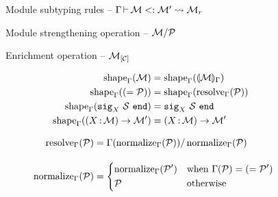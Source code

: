 \documentclass{article}
\theoremstyle{definition}
\begin{document}
\begin{figure}[tbp]
  \vspace{-3mm}
  \caption{Module subtyping rules -- $\submod{\E}{\iM}{\iM'}{\iM_r}$}
  \label{module:subtyping}
\end{figure}

\begin{figure}[tbp]
  
  \caption{Module strengthening operation -- $\Sstrengthen{l}{\iP}{\iM}$}
  \label{module:strengthen}
\end{figure}

\begin{figure}[tbp]
  
  \caption{Enrichment operation -- $\Senrich{\iC}{\iM}$}
  \label{module:enrich}
\end{figure}

\begin{figure}[tbp]
  \vspace{-3mm}
  \caption{Lookup rules -- $\lookup{\E}{\ip} = \iM$}
  \label{module:lookup}

  \begin{subfigure}[t]{0.5\linewidth}
    \begin{align*}
      \Oshape{\E}{\iM} &= \Oshape{\E}{\Oreduce{\E}{\iM}}\\
      \Oshape{\E}{\Salias{\iP}} &= \Oshape{\E}{\resolve{\E}{\iP}}\\
      \Oshape{\E}{\Ssig{\ix}{\iS}} &= \Ssig{\ix}{\iS}\\
      \Oshape{\E}{\Sfunctor{\ix}{\iM}{\iM'}} &= \Sfunctor{\ix}{\iM}{\iM'}
    \end{align*}
  \end{subfigure}
  \begin{subfigure}[t]{0.5\linewidth}
    \begin{align*}
      \resolve{\E}{\iP}
      &= \Sstrengthen{}{\Onormalize{\E}{\iP}}{\lookup{\E}{\Onormalize{\E}{\iP}}}
      \\[1em]
      \Onormalize{\E}{\iP}
      &=
        \begin{dcases}
          \Onormalize{\E}{\iP'} & \text{when } \lookup{\E}{\iP} = \Salias{\iP'} \\
          \iP & \text{otherwise}
        \end{dcases}
    \end{align*}
  \end{subfigure}

\end{figure}
\end{document}

